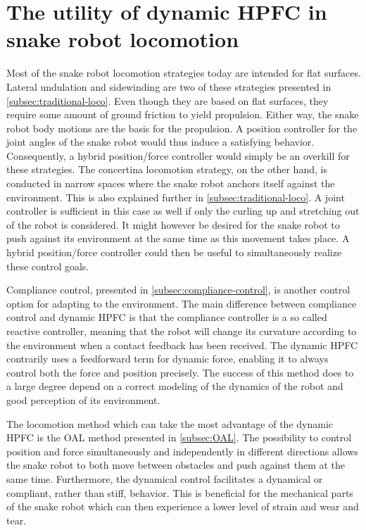 \section{The utility of dynamic HPFC in snake robot locomotion}\label{sec:locomotion-hpfc}

Most of the snake robot locomotion strategies today are intended for flat surfaces. Lateral undulation and sidewinding are two of these strategies presented in \ref{subsec:traditional-loco}. Even though they are based on flat surfaces, they require some amount of ground friction to yield propulsion. Either way, the snake robot body motions are the basis for the propulsion. A position controller for the joint angles of the snake robot would thus induce a satisfying behavior. Consequently, a hybrid position/force controller would simply be an overkill for these strategies. The concertina locomotion strategy, on the other hand, is conducted in narrow spaces where the snake robot anchors itself against the environment. This is also explained further in \ref{subsec:traditional-loco}. A joint controller is sufficient in this case as well if only the curling up and stretching out of the robot is considered. It might however be desired for the snake robot to push against its environment at the same time as this movement takes place. A hybrid position/force controller could then be useful to simultaneously realize these control goals.

Compliance control, presented in \ref{subsec:compliance-control}, is another control option for adapting to the environment. The main difference between compliance control and dynamic HPFC is that the compliance controller is a so called reactive controller, meaning that the robot will change its curvature according to the environment when a contact feedback has been received. The dynamic HPFC contrarily uses a feedforward term for dynamic force, enabling it to always control both the force and position precisely. The success of this method does to a large degree depend on a correct modeling of the dynamics of the robot and good perception of its environment.

The locomotion method which can take the most advantage of the dynamic HPFC is the OAL method presented in \ref{subsec:OAL}. The possibility to control position and force simultaneously and independently in different directions allows the snake robot to both move between obstacles and push against them at the same time. Furthermore, the dynamical control facilitates a dynamical or compliant, rather than stiff, behavior. This is beneficial for the mechanical parts of the snake robot which can then experience a lower level of strain and wear and tear. 


